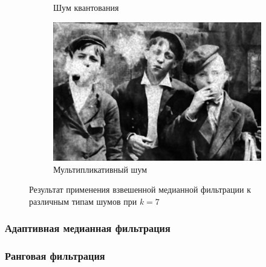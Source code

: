\begin{figure}[ht]
\begin{subfigure}[b]{0.5\linewidth}
      \caption{Шум квантования} 
      \label{median2d_7:e}
    \end{subfigure}%
    \begin{subfigure}[b]{0.5\linewidth}
        \centering
        \includegraphics[width=0.95\linewidth]{../Median_2D_Filter/Median_2DSpeckle_noise_(k=7).jpg} 
        \caption{Мультипликативный шум} 
        \label{median2d_7:f} 
    \end{subfigure} 
    \caption{Результат применения взвешенной медианной фильтрации к различным типам шумов при $k = 7$}
    \label{img:median2d_7} 
\end{figure}
\FloatBarrier


\subsubsection{Адаптивная медианная фильтрация}
\subsubsection{Ранговая фильтрация}

